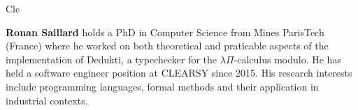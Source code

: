 \begin{sitedescription}{Cle}
\begin{compactitem}
\item\textbf{Ronan Saillard} holds a PhD in Computer Science from Mines ParisTech (France) where he worked on both theoretical and praticable 
aspects of the implementation of Dedukti, a typechecker for the $\lambda\Pi$-calculus modulo. He has held a software engineer position at 
CLEARSY since 2015. His research interests include programming languages, formal methods and their application in industrial contexts.
\end{compactitem}

\end{sitedescription}

